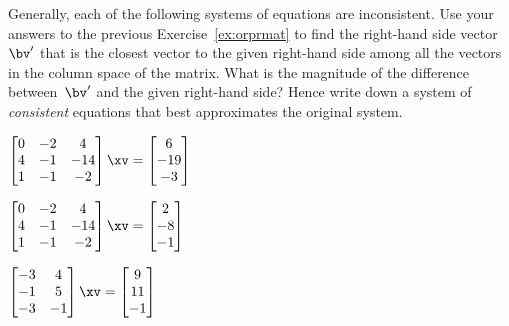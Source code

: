 \begin{exercise} \label{ex:aicebcb} 
Generally, each of the following systems of equations are inconsistent.
Use your answers to the previous Exercise~\ref{ex:orprmat} to find the right-hand side vector~\(\bv'\) that is the closest vector to the given right-hand side among all the vectors in the column space of the matrix.  
What is the magnitude of the difference between~\(\bv'\) and the given right-hand side?
Hence write down a system of \emph{consistent} equations that best approximates the original system.
\begin{parts}
\item \(\begin{bmatrix} 0&-2&4
\\4&-1&-14
\\1&-1&-2 \end{bmatrix}\xv
=\begin{bmatrix} 6\\-19\\-3 \end{bmatrix}\)

\item \(\begin{bmatrix} 0&-2&4
\\4&-1&-14
\\1&-1&-2 \end{bmatrix}\xv
=\begin{bmatrix} 2\\-8\\-1 \end{bmatrix}\)

\item \(\begin{bmatrix} -3&4
\\-1&5
\\-3&-1 \end{bmatrix}\xv
=\begin{bmatrix} 9\\11\\-1 \end{bmatrix}\)


\end{parts}
\end{exercise}
